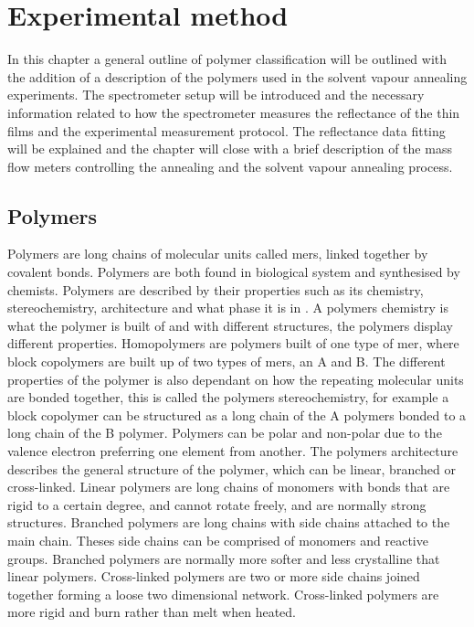 \documentclass[MasterThesisMain.tex]{subfiles}
\begin{document}
	\chapter{Experimental method}\label{experimentalmethod}
	
In this chapter a general outline of polymer classification will be outlined with the addition of a description	of the polymers used in the solvent vapour annealing experiments. The spectrometer setup will be introduced and the necessary information related to how the spectrometer measures the reflectance of the thin films and the experimental measurement protocol. The reflectance data fitting will be explained and the chapter will close with a brief description of the mass flow meters controlling the annealing and the solvent vapour annealing process. 
	
\section{Polymers}
Polymers are long chains of molecular units called mers, linked together by covalent bonds. Polymers are both found in biological system and synthesised by chemists. Polymers are described by their properties such as its chemistry, stereochemistry, architecture and what phase it is in \cite{jones2002soft}. A polymers chemistry is what the polymer is built of and with different structures, the polymers display different properties. Homopolymers are polymers built of one type of mer, where block copolymers are built up of two types of mers, an A and B. The different properties of the polymer is also dependant on how the repeating molecular units are bonded together, this is called the polymers stereochemistry, for example a block copolymer can be structured as a long chain of the A polymers bonded to a long chain of the B polymer. Polymers can be polar and non-polar due to the valence electron preferring one element from another. The polymers architecture describes the general structure of the polymer, which can be linear, branched or cross-linked. Linear polymers are long chains of monomers with bonds that are rigid to a certain degree, and cannot rotate freely, and are normally strong structures. Branched polymers are long chains with side chains attached to the main chain. Theses side chains can be comprised of monomers and reactive groups. Branched polymers are normally more softer and less crystalline that linear polymers. Cross-linked polymers are two or more side chains joined together forming a loose two dimensional network. Cross-linked polymers are more rigid and burn rather than melt when heated. 
\end{document}

